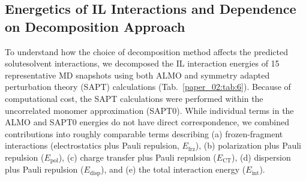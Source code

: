 \documentclass[%
  class = book,%
  crop = false,%
  float = true,%
  multi = true,%
  preview = false,%
]{standalone}
\newcommand{\cotil}{\ce{CO2}\textendash{}IL\xspace}%
\begin{document}
\subsection{\texorpdfstring{Energetics of \cotil Interactions and Dependence on Decomposition Approach}{Energetics of CO2-IL Interactions and Dependence on Decomposition Approach}}
\label{paper_02:sssec:IIIC2}

To understand how the choice of decomposition method affects the predicted solute\textendash{}solvent interactions, we decomposed the \cotil interaction energies of \num{15} representative MD snapshots using both ALMO and symmetry adapted perturbation theory (SAPT) calculations (Tab.~\ref{paper_02:tab:6}). Because of computational cost, the SAPT calculations were performed within the uncorrelated monomer approximation (SAPT0). While individual terms in the ALMO and SAPT0 energies do not have direct correspondence, we combined contributions into roughly comparable terms describing (a) frozen-fragment interactions (electrostatics plus Pauli repulsion, \(E_{\text{frz}}\)), (b) polarization plus Pauli repulsion (\(E_{\text{pol}}\)), (c) charge transfer plus Pauli repulsion (\(E_{\text{CT}}\)), (d) dispersion plus Pauli repulsion (\(E_{\text{disp}}\)), and (e) the total interaction energy (\(E_{\text{int}}\)).
\end{document}
